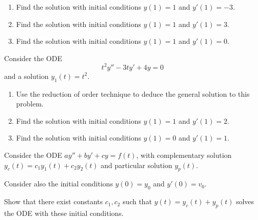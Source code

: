 \begin{exercises}
\begin{problist}
\begin{enumerate}
		{\bf Hint.} You should find a second-order ODE for $u(t)$ without the term $u(t)$. So define $v(t) = u'(t)$ and solve the first-order ODE for $v(t)$.
		
		


		
		
		\item Find the solution with initial conditions $y(1)=1$ and $y'(1)=-3$.
		\item Find the solution with initial conditions $y(1)=1$ and $y'(1)=3$.
		\item Find the solution with initial conditions $y(1)=1$ and $y'(1)=0$.
	\end{enumerate}


	\prob Consider the ODE
	$$
	t^2 y'' - 3 t y' + 4 y = 0
	$$
	and a solution $y_1(t) = t^2$.
	
	\begin{enumerate}
		\item Use the reduction of order technique to deduce the general solution to this problem.
		
	
		
		\item Find the solution with initial conditions $y(1)=1$ and $y'(1)=2$.
		\item Find the solution with initial conditions $y(1)=0$ and $y'(1)=1$.
	\end{enumerate}



	
	\prob Consider the ODE $a y'' +by'+cy = f(t)$, with complementary solution $y_c(t) =c_1 y_1(t) + c_2 y_2(t)$ and particular solution $y_p(t)$.
	
	Consider also the initial conditions $y(0)=y_0$ and $y'(0)=v_0$.
	
	Show that there exist constants $c_1, c_2$ such that $y(t) = y_c(t) + y_p(t)$ solves the ODE with these initial conditions.
	
	\end{problist}
\end{exercises}
